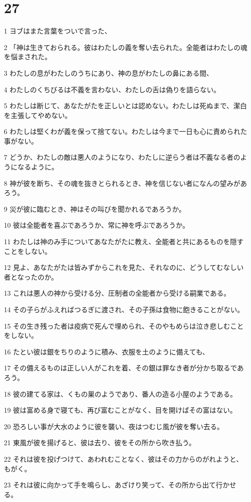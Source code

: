 \chapter{27}

\par 1 ヨブはまた言葉をついで言った、
\par 2 「神は生きておられる。彼はわたしの義を奪い去られた。全能者はわたしの魂を悩まされた。
\par 3 わたしの息がわたしのうちにあり、神の息がわたしの鼻にある間、
\par 4 わたしのくちびるは不義を言わない、わたしの舌は偽りを語らない。
\par 5 わたしは断じて、あなたがたを正しいとは認めない。わたしは死ぬまで、潔白を主張してやめない。
\par 6 わたしは堅くわが義を保って捨てない。わたしは今まで一日も心に責められた事がない。
\par 7 どうか、わたしの敵は悪人のようになり、わたしに逆らう者は不義なる者のようになるように。
\par 8 神が彼を断ち、その魂を抜きとられるとき、神を信じない者になんの望みがあろう。
\par 9 災が彼に臨むとき、神はその叫びを聞かれるであろうか。
\par 10 彼は全能者を喜ぶであろうか、常に神を呼ぶであろうか。
\par 11 わたしは神のみ手についてあなたがたに教え、全能者と共にあるものを隠すことをしない。
\par 12 見よ、あなたがたは皆みずからこれを見た、それなのに、どうしてむなしい者となったのか。
\par 13 これは悪人の神から受ける分、圧制者の全能者から受ける嗣業である。
\par 14 その子らがふえればつるぎに渡され、その子孫は食物に飽きることがない。
\par 15 その生き残った者は疫病で死んで埋められ、そのやもめらは泣き悲しむことをしない。
\par 16 たとい彼は銀をちりのように積み、衣服を土のように備えても、
\par 17 その備えるものは正しい人がこれを着、その銀は罪なき者が分かち取るであろう。
\par 18 彼の建てる家は、くもの巣のようであり、番人の造る小屋のようである。
\par 19 彼は富める身で寝ても、再び富むことがなく、目を開けばその富はない。
\par 20 恐ろしい事が大水のように彼を襲い、夜はつむじ風が彼を奪い去る。
\par 21 東風が彼を揚げると、彼は去り、彼をその所から吹き払う。
\par 22 それは彼を投げつけて、あわれむことなく、彼はその力からのがれようと、もがく。
\par 23 それは彼に向かって手を鳴らし、あざけり笑って、その所から出て行かせる。

